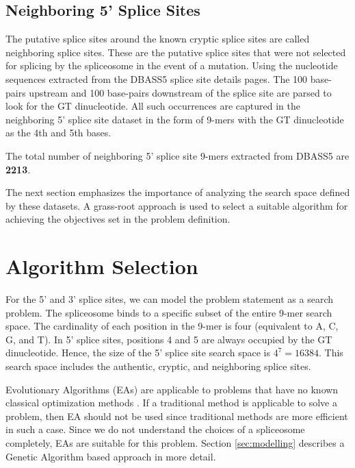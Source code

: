 \documentclass[12pt,a4paper]{article}
\begin{document}
	\subsection{Neighboring 5' Splice Sites}
	The putative splice sites around the known cryptic splice sites are called neighboring splice sites. These are the putative splice sites that were not selected for splicing by the spliceosome in the event of a mutation. Using the nucleotide sequences extracted from the DBASS5 splice site details pages. The 100 base-pairs upstream and 100 base-pairs downstream of the splice site are parsed to look for the GT dinucleotide. All such occurrences are captured in the neighboring 5’ splice site dataset in the form of 9-mers with the GT dinucleotide as the 4th and 5th bases.\par
	
	The total number of neighboring 5’ splice site 9-mers extracted from DBASS5 are \textbf{2213}. \par
	
	The next section emphasizes the importance of analyzing the search space defined by these datasets. A grass-root approach is used to select a suitable algorithm for achieving the objectives set in the problem definition.
	
	\section{Algorithm Selection}
	For the 5’ and 3' splice sites, we can model the problem statement as a search problem. The spliceosome binds to a specific subset of the entire 9-mer search space. The cardinality of each position in the 9-mer is four (equivalent to A, C, G, and T). In 5' splice sites, positions 4 and 5 are always occupied by the GT dinucleotide. Hence, the size of the 5' splice site search space is $ 4^{7} = 16384 $. This search space includes the authentic, cryptic, and neighboring splice sites. \par
	Evolutionary Algorithms (EAs) are applicable to problems that have no known classical optimization methods \cite{handbook}. If a traditional method is applicable to solve a problem, then EA should not be used since traditional methods are more efficient in such a case. Since we do not understand the choices of a spliceosome completely, EAs are suitable for this problem. Section \ref{sec:modelling} describes a Genetic Algorithm based approach in more detail.\par
\end{document}
